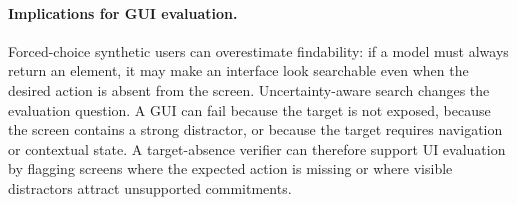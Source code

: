 \paragraph{Implications for GUI evaluation.}
Forced-choice synthetic users can overestimate findability: if a model must always return an element, it may make an interface look searchable even when the desired action is absent from the screen. Uncertainty-aware search changes the evaluation question. A GUI can fail because the target is not exposed, because the screen contains a strong distractor, or because the target requires navigation or contextual state. A target-absence verifier can therefore support UI evaluation by flagging screens where the expected action is missing or where visible distractors attract unsupported commitments.
